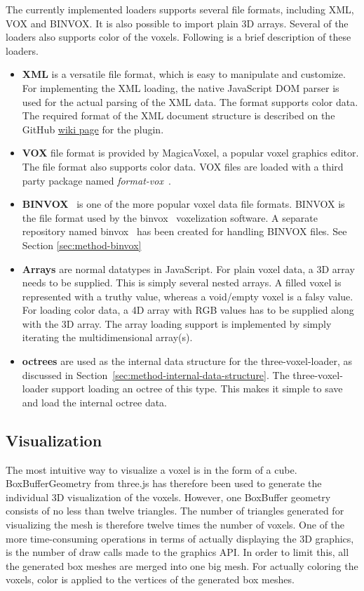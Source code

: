 The currently implemented loaders supports several file formats, including XML, VOX and BINVOX. It is also possible to import plain 3D arrays. Several of the loaders also supports color of the voxels. Following is a brief description of these loaders.
\begin{itemize}
    \item \textbf{XML} is a versatile file format, which is easy to manipulate and customize. For implementing the XML loading, the native JavaScript DOM parser is used for the actual parsing of the XML data. The format supports color data. The required format of the XML document structure is described on the GitHub \href{https://github.com/andstor/three-voxel-loader/wiki/XML-format}{wiki page} for the plugin.
    \item \textbf{VOX} file format is provided by MagicaVoxel, a popular voxel graphics editor. The file format also supports color data. VOX files are loaded with a third party package named \textit{format-vox}~\cite{format-vox}.
    \item \textbf{BINVOX}~\cite{binvox-file-format} is one of the more popular voxel data file formats. BINVOX is the file format used by the binvox~\cite{binvox} voxelization software. A separate repository named binvox~\cite{andstor-binvox} has been created for handling BINVOX files. See Section \ref{sec:method-binvox}
    \item \textbf{Arrays} are normal datatypes in JavaScript. For plain voxel data, a 3D array needs to be supplied. This is simply several nested arrays. A filled voxel is represented with a truthy value, whereas a void/empty voxel is a falsy value. For loading color data, a 4D array with RGB values has to be supplied along with the 3D array. The array loading support is implemented by simply iterating the multidimensional array(s). 
    \item \textbf{octrees} are used as the internal data structure for the three-voxel-loader, as discussed in Section~\ref{sec:method-internal-data-structure}. The three-voxel-loader support loading an octree of this type. This makes it simple to save and load the internal octree data.
\end{itemize}

\subsection{Visualization}
The most intuitive way to visualize a voxel is in the form of a cube. BoxBufferGeometry from three.js has therefore been used to generate the individual 3D visualization of the voxels. However, one BoxBuffer geometry consists of no less than twelve triangles. The number of triangles generated for visualizing the mesh is therefore twelve times the number of voxels. One of the more time-consuming operations in terms of actually displaying the 3D graphics, is the number of draw calls made to the graphics API. In order to limit this, all the generated box meshes are merged into one big mesh. For actually coloring the voxels, color is applied to the vertices of the generated box meshes.

